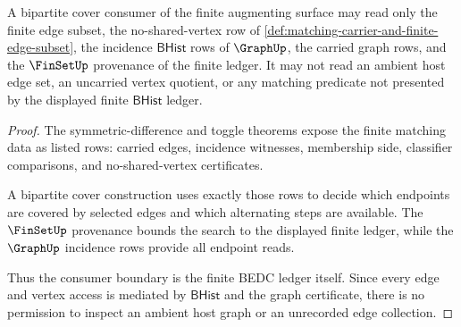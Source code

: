 \begin{theorem}
\label{thm:matching-bipartite-cover-consumer-boundary}
A bipartite cover consumer of the finite augmenting surface may read only the
finite edge subset, the no-shared-vertex row of
\autoref{def:matching-carrier-and-finite-edge-subset}, the incidence
$\mathsf{BHist}$ rows of $\GraphUp$, the carried graph rows, and the
$\FinSetUp$ provenance of the finite ledger. It may not read an ambient host
edge set, an uncarried vertex quotient, or any matching predicate not presented
by the displayed finite $\mathsf{BHist}$ ledger.
\end{theorem}
\begin{proof}
The symmetric-difference and toggle theorems expose the finite matching data as
listed rows: carried edges, incidence witnesses, membership side, classifier
comparisons, and no-shared-vertex certificates.

A bipartite cover construction uses exactly those rows to decide which
endpoints are covered by selected edges and which alternating steps are
available. The $\FinSetUp$ provenance bounds the search to the displayed
finite ledger, while the $\GraphUp$ incidence rows provide all endpoint reads.

Thus the consumer boundary is the finite BEDC ledger itself. Since every edge
and vertex access is mediated by $\mathsf{BHist}$ and the graph certificate,
there is no permission to inspect an ambient host graph or an unrecorded edge
collection.
\end{proof}

